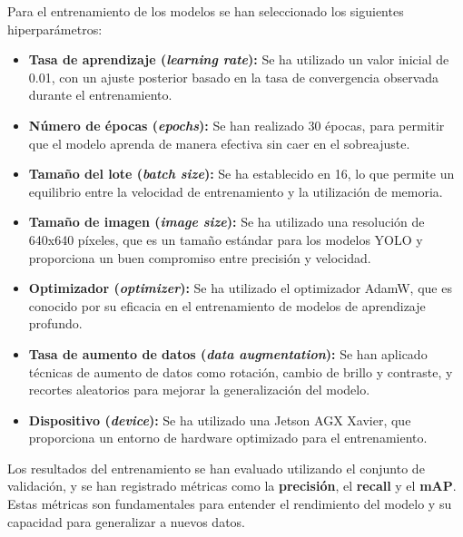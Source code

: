 \documentclass[11pt,spanish,listoffigures,listoftables]{tfgetsinf}
\begin{document}
Para el entrenamiento de los modelos se han seleccionado los siguientes hiperparámetros:
\begin{itemize}
   \item \textbf{Tasa de aprendizaje (\textit{learning rate}):} Se ha utilizado un valor inicial de 0.01, con un ajuste posterior basado en la tasa de convergencia observada durante el entrenamiento.
   \item \textbf{Número de épocas (\textit{epochs}):} Se han realizado 30 épocas, para permitir que el modelo aprenda de manera efectiva sin caer en el sobreajuste.
   \item \textbf{Tamaño del lote (\textit{batch size}):} Se ha establecido en 16, lo que permite un equilibrio entre la velocidad de entrenamiento y la utilización de memoria.
   \item \textbf{Tamaño de imagen (\textit{image size}):} Se ha utilizado una resolución de 640x640 píxeles, que es un tamaño estándar para los modelos YOLO y proporciona un buen compromiso entre precisión y velocidad.
   \item \textbf{Optimizador (\textit{optimizer}):} Se ha utilizado el optimizador AdamW, que es conocido por su eficacia en el entrenamiento de modelos de aprendizaje profundo.
   \item \textbf{Tasa de aumento de datos (\textit{data augmentation}):} Se han aplicado técnicas de aumento de datos como rotación, cambio de brillo y contraste, y recortes aleatorios para mejorar la generalización del modelo.
   \item \textbf{Dispositivo (\textit{device}):} Se ha utilizado una Jetson AGX Xavier, que proporciona un entorno de hardware optimizado para el entrenamiento.
\end{itemize}



Los resultados del entrenamiento se han evaluado utilizando el conjunto de validación, y se han registrado métricas como la \textbf{precisión}, el \textbf{recall} y el \textbf{mAP}. Estas métricas son fundamentales para entender el rendimiento del modelo y su capacidad para generalizar a nuevos datos.
\end{document}
